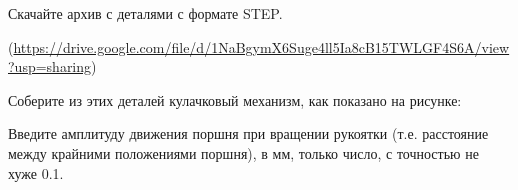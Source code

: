 
Скачайте архив с деталями с формате STEP. 

(\url{https://drive.google.com/file/d/1NaBgymX6Suge4ll5Ia8cB15TWLGF4S6A/view?usp=sharing}) 

Соберите из этих деталей кулачковый механизм, как показано на рисунке:


Введите амплитуду движения поршня при вращении рукоятки (т.е. расстояние между крайними положениями поршня), в мм, только число, с точностью не хуже 0.1.

